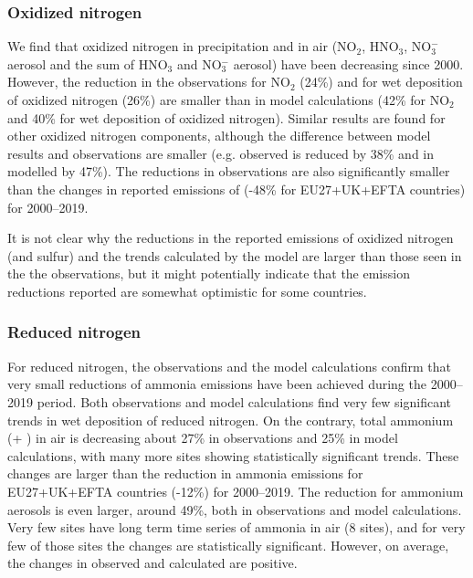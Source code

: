 \subsubsection*{Oxidized nitrogen}
We find that oxidized nitrogen in precipitation and in air (NO$_2$, HNO$_3$, NO$_3^{-}$ aerosol and the sum of HNO$_3$ and NO$_3^{-}$ aerosol) have been decreasing since 2000. However, the reduction in the observations 
for NO$_2$ (24\%) and for wet deposition of oxidized nitrogen (26\%) %
are smaller than in model calculations (42\%
for NO$_2$ and 40\% 
for wet deposition of oxidized nitrogen). Similar results are found for other oxidized nitrogen components, although the difference between model results and observations are smaller (e.g. observed \noiii is reduced by 38\% and in modelled by 47\%). The reductions in observations
are also significantly smaller than the changes in reported emissions of \noii (-48\% for EU27+UK+EFTA countries) for 2000--2019.

It is not clear why the reductions in the reported emissions of oxidized nitrogen (and sulfur) and the trends calculated by the model are larger than those seen in the the observations, but it might potentially indicate that the emission reductions reported are somewhat optimistic for some countries.

\subsubsection*{Reduced nitrogen}
For reduced nitrogen, the observations and the model calculations confirm that very small reductions of ammonia emissions have been achieved during the 2000--2019 period. 
Both observations and model calculations find very few significant trends in wet deposition of reduced nitrogen.
On the contrary, total ammonium (\nhiii + \nhiv) in air is decreasing about 27\% in observations and 25\% in model calculations, with many more sites showing statistically significant trends.
These changes are larger than the reduction in ammonia emissions for EU27+UK+EFTA countries (-12\%)
for 2000--2019. The reduction for ammonium aerosols is even larger, around 49\%, 
both in observations and model calculations. Very few sites have long term time series of ammonia in air (8 sites), and for very few of those sites the changes are statistically significant. However, on average, the changes in observed and calculated are positive. 


